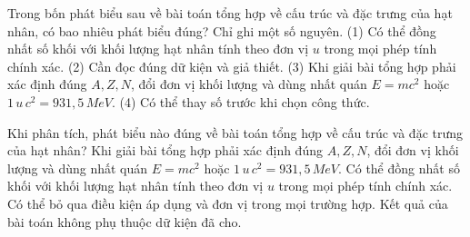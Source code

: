 \begin{ex}
Trong bốn phát biểu sau về bài toán tổng hợp về cấu trúc và đặc trưng của hạt nhân, có bao nhiêu phát biểu đúng? Chỉ ghi một số nguyên. (1) Có thể đồng nhất số khối với khối lượng hạt nhân tính theo đơn vị $u$ trong mọi phép tính chính xác. (2) Cần đọc đúng dữ kiện và giả thiết. (3) Khi giải bài tổng hợp phải xác định đúng $A,Z,N$, đổi đơn vị khối lượng và dùng nhất quán $E=mc^2$ hoặc $1\,u\,c^2=931,5\,MeV$. (4) Có thể thay số trước khi chọn công thức.
\end{ex}

\begin{ex}
Khi phân tích, phát biểu nào đúng về bài toán tổng hợp về cấu trúc và đặc trưng của hạt nhân?
\choice
{\True Khi giải bài tổng hợp phải xác định đúng $A,Z,N$, đổi đơn vị khối lượng và dùng nhất quán $E=mc^2$ hoặc $1\,u\,c^2=931,5\,MeV$.}
{Có thể đồng nhất số khối với khối lượng hạt nhân tính theo đơn vị $u$ trong mọi phép tính chính xác.}
{Có thể bỏ qua điều kiện áp dụng và đơn vị trong mọi trường hợp.}
{Kết quả của bài toán không phụ thuộc dữ kiện đã cho.}
\end{ex}

